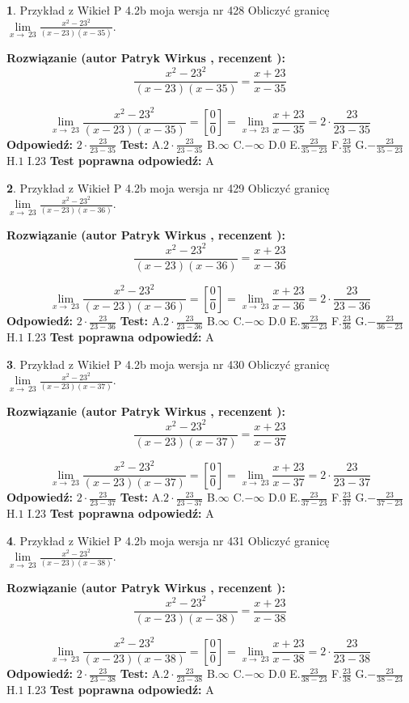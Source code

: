\documentclass[12pt, a4paper]{article}
\theoremstyle{definition} %
\newtheorem{zad}{}
\newcommand{\zadStart}[1]{\begin{zad}#1\newline}
\newcommand{\zadStop}{\end{zad}}
\newcommand{\rozwStart}[2]{\noindent \textbf{Rozwiązanie (autor #1 , recenzent #2): }\newline}
\newcommand{\rozwStop}{\newline}
\newcommand{\odpStart}{\noindent \textbf{Odpowiedź:}\newline}
\newcommand{\odpStop}{\newline}
\newcommand{\testStart}{\noindent \textbf{Test:}\newline}
\newcommand{\testStop}{\newline}
\newcommand{\kluczStart}{\noindent \textbf{Test poprawna odpowiedź:}\newline}
\newcommand{\kluczStop}{\newline}
\begin{document}
\zadStart{Przykład z Wikieł P 4.2b moja wersja nr 428}
Obliczyć granicę $\lim\limits_{x\to\ 23}\frac{x^{2}-23^{2}}{(x-23)(x-35)}$.
\zadStop
\rozwStart{Patryk Wirkus}{}
$$\frac{x^{2}-23^{2}}{(x-23)(x-35)}=\frac{x+23}{x-35}$$

$$\lim\limits_{x\to\ 23}\frac{x^{2}-23^{2}}{(x-23)(x-35)}=[\frac{0}{0}]=\lim\limits_{x\to\ 23}\frac{x+23}{x-35}=2 \cdot \frac{23}{23-35}$$
\rozwStop
\odpStart
$2 \cdot \frac{23}{23-35}$
\odpStop
\testStart
A.$2 \cdot \frac{23}{23-35}$
B.$\infty$
C.$-\infty$
D.$0$
E.$\frac{23}{35-23}$
F.$\frac{23}{35}$
G.$-\frac{23}{35-23}$
H.$1$
I.$23$
\testStop
\kluczStart
A
\kluczStop



\zadStart{Przykład z Wikieł P 4.2b moja wersja nr 429}
Obliczyć granicę $\lim\limits_{x\to\ 23}\frac{x^{2}-23^{2}}{(x-23)(x-36)}$.
\zadStop
\rozwStart{Patryk Wirkus}{}
$$\frac{x^{2}-23^{2}}{(x-23)(x-36)}=\frac{x+23}{x-36}$$

$$\lim\limits_{x\to\ 23}\frac{x^{2}-23^{2}}{(x-23)(x-36)}=[\frac{0}{0}]=\lim\limits_{x\to\ 23}\frac{x+23}{x-36}=2 \cdot \frac{23}{23-36}$$
\rozwStop
\odpStart
$2 \cdot \frac{23}{23-36}$
\odpStop
\testStart
A.$2 \cdot \frac{23}{23-36}$
B.$\infty$
C.$-\infty$
D.$0$
E.$\frac{23}{36-23}$
F.$\frac{23}{36}$
G.$-\frac{23}{36-23}$
H.$1$
I.$23$
\testStop
\kluczStart
A
\kluczStop



\zadStart{Przykład z Wikieł P 4.2b moja wersja nr 430}
Obliczyć granicę $\lim\limits_{x\to\ 23}\frac{x^{2}-23^{2}}{(x-23)(x-37)}$.
\zadStop
\rozwStart{Patryk Wirkus}{}
$$\frac{x^{2}-23^{2}}{(x-23)(x-37)}=\frac{x+23}{x-37}$$

$$\lim\limits_{x\to\ 23}\frac{x^{2}-23^{2}}{(x-23)(x-37)}=[\frac{0}{0}]=\lim\limits_{x\to\ 23}\frac{x+23}{x-37}=2 \cdot \frac{23}{23-37}$$
\rozwStop
\odpStart
$2 \cdot \frac{23}{23-37}$
\odpStop
\testStart
A.$2 \cdot \frac{23}{23-37}$
B.$\infty$
C.$-\infty$
D.$0$
E.$\frac{23}{37-23}$
F.$\frac{23}{37}$
G.$-\frac{23}{37-23}$
H.$1$
I.$23$
\testStop
\kluczStart
A
\kluczStop



\zadStart{Przykład z Wikieł P 4.2b moja wersja nr 431}
Obliczyć granicę $\lim\limits_{x\to\ 23}\frac{x^{2}-23^{2}}{(x-23)(x-38)}$.
\zadStop
\rozwStart{Patryk Wirkus}{}
$$\frac{x^{2}-23^{2}}{(x-23)(x-38)}=\frac{x+23}{x-38}$$

$$\lim\limits_{x\to\ 23}\frac{x^{2}-23^{2}}{(x-23)(x-38)}=[\frac{0}{0}]=\lim\limits_{x\to\ 23}\frac{x+23}{x-38}=2 \cdot \frac{23}{23-38}$$
\rozwStop
\odpStart
$2 \cdot \frac{23}{23-38}$
\odpStop
\testStart
A.$2 \cdot \frac{23}{23-38}$
B.$\infty$
C.$-\infty$
D.$0$
E.$\frac{23}{38-23}$
F.$\frac{23}{38}$
G.$-\frac{23}{38-23}$
H.$1$
I.$23$
\testStop
\kluczStart
A
\kluczStop
\end{document}
